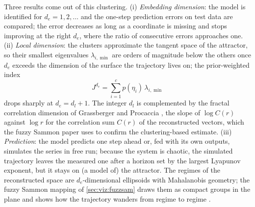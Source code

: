 Three results come out of this clustering. (i) \emph{Embedding dimension}: the model is identified for $d_e=1,2,\dots$ and the one-step prediction errors on test data are compared; the error decreases as long as a coordinate is missing and stops improving at the right $d_e$, where the ratio of consecutive errors approaches one. (ii) \emph{Local dimension}: the clusters approximate the tangent space of the attractor, so their smallest eigenvalues $\lambda_{i,\min}$ are orders of magnitude below the others once $d_e$ exceeds the dimension of the surface the trajectory lives on; the prior-weighted index
\begin{equation}
  J^{d_e}=\sum_{i=1}^{c}p(\eta_i)\,\lambda_{i,\min}
  \label{eq:ts:localdim}
\end{equation}
drops sharply at $d_e=d_l+1$. The integer $d_l$ is complemented by the fractal correlation dimension of Grassberger and Procaccia \cite{grassberger:1983}, the slope of $\log C(r)$ against $\log r$ for the correlation sum $C(r)$ of the reconstructed vectors, which the fuzzy Sammon paper \cite{feil:2007:fuzzsam} uses to confirm the clustering-based estimate. (iii) \emph{Prediction}: the model predicts one step ahead or, fed with its own outputs, simulates the series in free run; because the system is chaotic, the simulated trajectory leaves the measured one after a horizon set by the largest Lyapunov exponent, but it stays on (a model of) the attractor. The regimes of the reconstructed space are $d_e$-dimensional ellipsoids with Mahalanobis geometry; the fuzzy Sammon mapping of \cref{sec:viz:fuzzsam} draws them as compact groups in the plane and shows how the trajectory wanders from regime to regime \cite{feil:2007:fuzzsam}.

